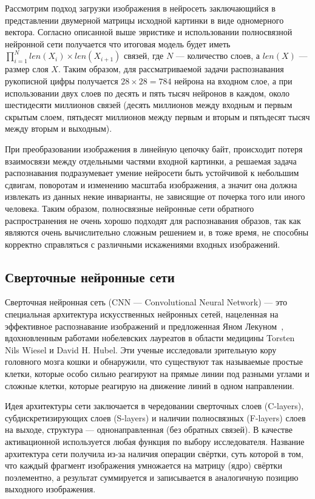 \documentclass[a4paper,14pt]{extarticle} %
\begin{document}
Рассмотрим подход загрузки изображения в нейросеть заключающийся в представлении двумерной матрицы исходной картинки в виде одномерного вектора. Согласно описанной выше эвристике и использовании полносвязной нейронной сети получается что итоговая модель будет иметь $\prod_{i=1}^{N} len(X_i)\times len(X_{i+1})$ связей, где $N$ --- количество слоев, а $len(X)$ --- размер слоя $X$. Таким образом, для рассматриваемой задачи распознавания рукописной цифры получается $28\times28=784$ нейрона на входном слое, а при использовании двух слоев по десять и пять тысяч нейронов в каждом, около шестидесяти миллионов связей (десять миллионов между входным и первым скрытым слоем, пятьдесят миллионов между первым и вторым и пятьдесят тысяч между вторым и выходным).

При преобразовании изображения в линейную цепочку байт, происходит потеря взаимосвязи между отдельными частями входной картинки, а решаемая задача распознавания подразумевает умение нейросети быть устойчивой к небольшим сдвигам, поворотам и изменению масштаба изображения, а значит она должна извлекать из данных некие инварианты, не зависящие от почерка того или иного человека. Таким образом, полносвязные нейронные сети обратного распространения не очень хорошо подходят для распознавания образов, так как являются очень вычислительно сложным решением и, в тоже время, не способны корректно справляться с различными искажениями входных изображений.

\subsection{Сверточные нейронные сети}
\hspace{\parindent} Сверточная нейронная сеть (CNN --- Convolutional Neural Network) --- это специальная архитектура искусственных нейронных сетей, нацеленная на эффективное распознавание изображений и предложенная Яном Лекуном~\cite{lecuncomparison}, вдохновленным работами нобелевских лауреатов в области медицины Torsten Nils Wiesel и David H. Hubel. Эти ученые исследовали зрительную кору головного мозга кошки и обнаружили, что существуют так называемые простые клетки, которые особо сильно реагируют на прямые линии под разными углами и сложные клетки, которые реагирую на движение линий в одном направлении. 

Идея архитектуры сети заключается в чередовании сверточных слоев (C-layers), субдискретизирующих слоев (S-layers) и наличии полносвязных (F-layers) слоев на выходе, структура --- однонаправленная (без обратных связей). В качестве активационной используется любая функция по выбору исследователя. Название архитектура сети получила из-за наличия операции свёртки, суть которой в том, что каждый фрагмент изображения умножается на матрицу (ядро) свёртки поэлементно, а результат суммируется и записывается в аналогичную позицию выходного изображения.
\end{document}
